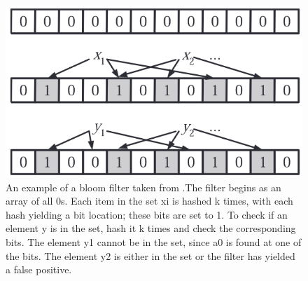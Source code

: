 \documentclass[MScCS]{uccthesis}
\begin{document}
\begin{figure}[h]
    \centering
    \includegraphics[width=\linewidth]{figures/bloom_filter_example.png}
    \caption{An example of a bloom filter taken from \cite{broder2004network}.The filter begins as an array of all 0s. Each item in the set xi is hashed k times, with each hash yielding a bit location; these bits are set to 1. To check if an element y is in the set, hash it k times and check the corresponding bits. The element y1 cannot be in the set, since a0 is found at one of the bits. The element y2 is either in the set or the filter has yielded a false positive.}
    \label{fig:bloomfilterExample}
\end{figure}
\end{document}
